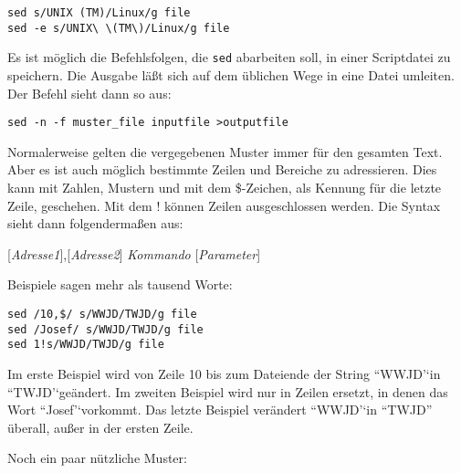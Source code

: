 \documentclass[12pt,]{article}
\begin{document}
\texttt{sed\ \textquotesingle{}s/UNIX\ (TM)/Linux/g\textquotesingle{}\ file}\\
\texttt{sed\ -e\ s/UNIX\textbackslash{}\ \textbackslash{}(TM\textbackslash{})/Linux/g\ file}

Es ist möglich die Befehlsfolgen, die \texttt{sed} abarbeiten soll, in
einer Scriptdatei zu speichern. Die Ausgabe läßt sich auf dem üblichen
Wege in eine Datei umleiten. Der Befehl sieht dann so aus:

\texttt{sed\ -n\ -f\ muster\_file\ inputfile\ \textgreater{}outputfile}

Normalerweise gelten die vergegebenen Muster immer für den gesamten
Text. Aber es ist auch möglich bestimmte Zeilen und Bereiche zu
adressieren. Dies kann mit Zahlen, Mustern und mit dem \$-Zeichen, als
Kennung für die letzte Zeile, geschehen. Mit dem ! können Zeilen
ausgeschlossen werden. Die Syntax sieht dann folgendermaßen aus:

{[}\emph{Adresse1}{]},{[}\emph{Adresse2}{]} \emph{Kommando}
{[}\emph{Parameter}{]}

Beispiele sagen mehr als tausend Worte:

\texttt{sed\ \textquotesingle{}/10,\$/\ s/WWJD/TWJD/g\textquotesingle{}\ file}\\
\texttt{sed\ \textquotesingle{}/Josef/\ s/WWJD/TWJD/g\textquotesingle{}\ file}\\
\texttt{sed\ \textquotesingle{}1!s/WWJD/TWJD/g\textquotesingle{}\ file}

Im erste Beispiel wird von Zeile 10 bis zum Dateiende der String
``WWJD'`in ``TWJD'`geändert. Im zweiten Beispiel wird nur in Zeilen
ersetzt, in denen das Wort ``Josef'`vorkommt. Das letzte Beispiel
verändert ``WWJD'`in ``TWJD'' überall, außer in der ersten Zeile.

Noch ein paar nützliche Muster:
\end{document}
